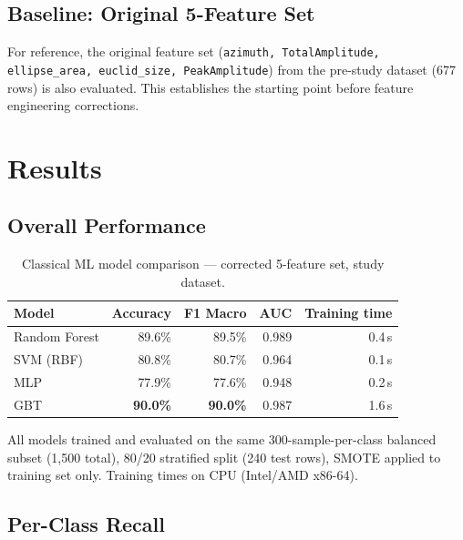 \documentclass[journal]{IEEEtran}
\begin{document}
\subsection{Baseline: Original 5-Feature Set}

For reference, the original feature set
(\texttt{azimuth, TotalAmplitude, ellipse\_area, euclid\_size, PeakAmplitude})
from the pre-study dataset (677 rows) is also evaluated. This establishes the
starting point before feature engineering corrections.

\section{Results}
\label{sec:results}

\subsection{Overall Performance}

\begin{table}[H]
\centering
\caption{Classical ML model comparison — corrected 5-feature set, study dataset.}
\label{tab:classical_results}
\begin{tabular}{lrrrr}
\toprule
\textbf{Model} & \textbf{Accuracy} & \textbf{F1 Macro} & \textbf{AUC} & \textbf{Training time} \\
\midrule
Random Forest  & 89.6\% & 89.5\% & 0.989 & 0.4\,s \\
SVM (RBF)      & 80.8\% & 80.7\% & 0.964 & 0.1\,s \\
MLP            & 77.9\% & 77.6\% & 0.948 & 0.2\,s \\
GBT            & \textbf{90.0\%} & \textbf{90.0\%} & 0.987 & 1.6\,s \\
\bottomrule
\end{tabular}
\end{table}

\noindent All models trained and evaluated on the same 300-sample-per-class balanced
subset (1,500 total), 80/20 stratified split (240 test rows), SMOTE applied to
training set only. Training times on CPU (Intel/AMD x86-64).

\subsection{Per-Class Recall}
\end{document}
